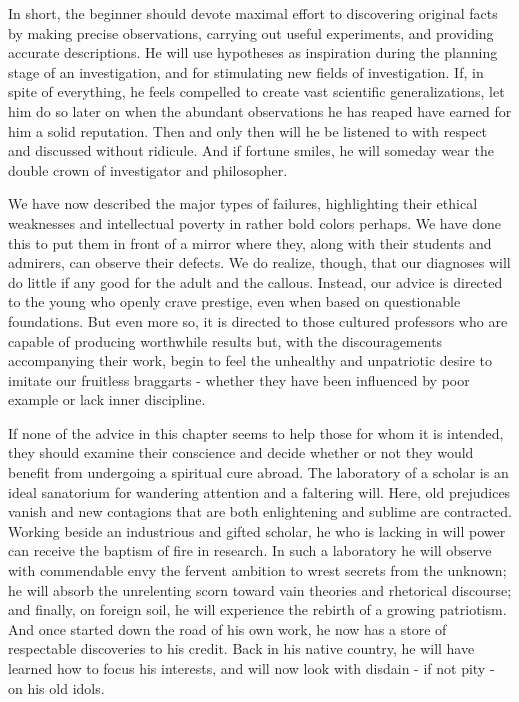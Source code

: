 \documentclass{article}
\begin{document}
In short, the beginner should devote maximal effort to discovering original facts by making precise observations, carrying out useful experiments, and providing accurate descriptions. He will use hypotheses as inspiration during the planning stage of an investigation, and for stimulating new fields of investigation. If, in spite of everything, he feels compelled to create vast scientific generalizations, let him do so later on when the abundant observations he has reaped have earned for him a solid reputation. Then and only then will he be listened to with respect and discussed without ridicule. And if fortune smiles, he will someday wear the double crown of investigator and philosopher.

We have now described the major types of failures, highlighting their ethical weaknesses and intellectual poverty in rather bold colors perhaps. We have done this to put them in front of a mirror where they, along with their students and admirers, can observe their defects. We do realize, though, that our diagnoses will do little if any good for the adult and the callous. Instead, our advice is directed to the young who openly crave prestige, even when based on questionable foundations. But even more so, it is directed to those cultured professors who are capable of producing worthwhile results but, with the discouragements accompanying their work, begin to feel the unhealthy and unpatriotic desire to imitate our fruitless braggarts - whether they have been influenced by poor example or lack inner discipline.

If none of the advice in this chapter seems to help those for whom it is intended, they should examine their conscience and decide whether or not they would benefit from undergoing a spiritual cure abroad. The laboratory of a scholar is an ideal sanatorium for wandering attention and a faltering will. Here, old prejudices vanish and new contagions that are both enlightening and sublime are contracted. Working beside an industrious and gifted scholar, he who is lacking in will power can receive the baptism of fire in research. In such a laboratory he will observe with commendable envy the fervent ambition to wrest secrets from the unknown; he will absorb the unrelenting scorn toward vain theories and rhetorical discourse; and finally, on foreign soil, he will experience the rebirth of a growing patriotism. And once started down the road of his own work, he now has a store of respectable discoveries to his credit. Back in his native country, he will have learned how to focus his interests, and will now look with disdain - if not pity - on his old idols.
\end{document}
